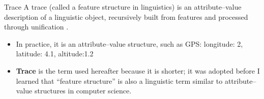 \begin{frame}[allowframebreaks]{Trace}
    A trace (called a \alert{feature structure} in linguistics) is an attribute--value description of a linguistic object, recursively built from features and processed through unification \cite{kay-1984-functional-unification-grammar}.
    
    
    \begin{itemize}
        \item In practice, it is an attribute--value structure, such as GPS:
            {longitude: 2, latitude: 4.1, altitude:1.2}
        \item \textbf{Trace} is the term used hereafter because it is shorter; it was adopted before I learned that ``feature structure'' is also a linguistic term similar to attribute--value structures in computer science.
    \end{itemize}

\end{frame}